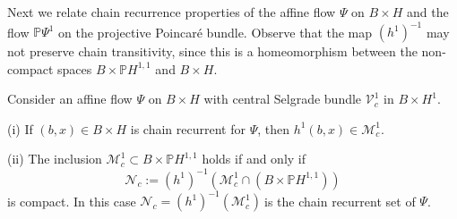 	Next we relate chain recurrence properties of the affine flow $\Psi$ on
	$B\times H$ and the flow $\mathbb{P}\Psi^{1}$ on the projective Poincar\'{e}
	bundle. Observe that the map $\left(  h^{1}\right)  ^{-1}$ may not preserve
	chain transitivity, since this is a homeomorphism between the non-compact
	spaces $B\times\mathbb{P}H^{1,1}$ and $B\times H$.
	
	\begin{corollary}
		\label{Corollary3.8}Consider an affine flow $\Psi$ on $B\times H$ with central
		Selgrade bundle $\mathcal{V}_{c}^{1}$ in $B\times H^{1}$.
		
		(i) If $(b,x)\in B\times H$ is chain recurrent for $\Psi$, then $h^{1}
		(b,x)\in\mathcal{M}_{c}^{1}$.
		
		(ii) The inclusion $\mathcal{M}_{c}^{1}\subset B\times\mathbb{P}H^{1,1}$ holds
		if and only if
		\[
		\mathcal{N}_{c}:=(h^{1})^{-1}\left(  \mathcal{M}_{c}^{1}\cap\left(
		B\times\mathbb{P}H^{1,1}\right)  \right)
		\]
		is compact. In this case $\mathcal{N}_{c}=\left(  h^{1}\right)  ^{-1}%
		(\mathcal{M}_{c}^{1})\ $is the chain recurrent set of $\Psi$.
	\end{corollary}
	
